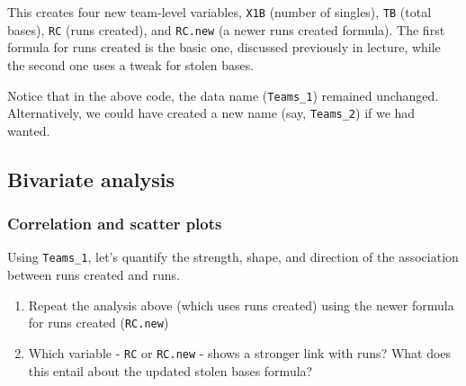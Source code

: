 \documentclass[]{article}
\newenvironment{Shaded}{\begin{snugshade}}{\end{snugshade}}
\newcommand{\DataTypeTok}[1]{\textcolor[rgb]{0.13,0.29,0.53}{#1}}
\newcommand{\DecValTok}[1]{\textcolor[rgb]{0.00,0.00,0.81}{#1}}
\newcommand{\KeywordTok}[1]{\textcolor[rgb]{0.13,0.29,0.53}{\textbf{#1}}}
\newcommand{\NormalTok}[1]{#1}
\newcommand{\OperatorTok}[1]{\textcolor[rgb]{0.81,0.36,0.00}{\textbf{#1}}}
\newcommand{\StringTok}[1]{\textcolor[rgb]{0.31,0.60,0.02}{#1}}
\begin{document}
This creates four new team-level variables, \texttt{X1B} (number of
singles), \texttt{TB} (total bases), \texttt{RC} (runs created), and
\texttt{RC.new} (a newer runs created formula). The first formula for
runs created is the basic one, discussed previously in lecture, while
the second one uses a tweak for stolen bases.

Notice that in the above code, the data name (\texttt{Teams\_1})
remained unchanged. Alternatively, we could have created a new name
(say, \texttt{Teams\_2}) if we had wanted.

\hypertarget{bivariate-analysis}{%
\subsection{Bivariate analysis}\label{bivariate-analysis}}

\hypertarget{correlation-and-scatter-plots}{%
\subsubsection{Correlation and scatter
plots}\label{correlation-and-scatter-plots}}

Using \texttt{Teams\_1}, let's quantify the strength, shape, and
direction of the association between runs created and runs.

\begin{Shaded}
\end{Shaded}

\begin{enumerate}
\def\labelenumi{\arabic{enumi}.}
\setcounter{enumi}{1}
\item
  Repeat the analysis above (which uses runs created) using the newer
  formula for runs created (\texttt{RC.new})
\item
  Which variable - \texttt{RC} or \texttt{RC.new} - shows a stronger
  link with runs? What does this entail about the updated stolen bases
  formula?
\end{enumerate}
\end{document}
